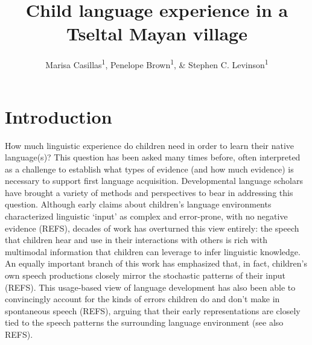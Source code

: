\documentclass[man]{apa6}
\title{Child language experience in a Tseltal Mayan village}
\author{Marisa Casillas\textsuperscript{1}, Penelope Brown\textsuperscript{1}, \& Stephen C. Levinson\textsuperscript{1}}
\affiliation{
    \vspace{0.5cm}
          \textsuperscript{1} Max Planck Institute for Psycholinguistics  }
\theoremstyle{definition}
\theoremstyle{definition}
\theoremstyle{definition}
\theoremstyle{remark}
\begin{document}
\maketitle

\setcounter{secnumdepth}{0}



\section{Introduction}\label{introduction}

How much linguistic experience do children need in order to learn their
native language(s)? This question has been asked many times before,
often interpreted as a challenge to establish what types of evidence
(and how much evidence) is necessary to support first language
acquisition. Developmental language scholars have brought a variety of
methods and perspectives to bear in addressing this question. Although
early claims about children's language environments characterized
linguistic `input' as complex and error-prone, with no negative evidence
(REFS), decades of work has overturned this view entirely: the speech
that children hear and use in their interactions with others is rich
with multimodal information that children can leverage to infer
linguistic knowledge. An equally important branch of this work has
emphasized that, in fact, children's own speech productions closely
mirror the stochastic patterns of their input (REFS). This usage-based
view of language development has also been able to convincingly account
for the kinds of errors children do and don't make in spontaneous speech
(REFS), arguing that their early representations are closely tied to the
speech patterns the surrounding language environment (see also REFS).
\end{document}
